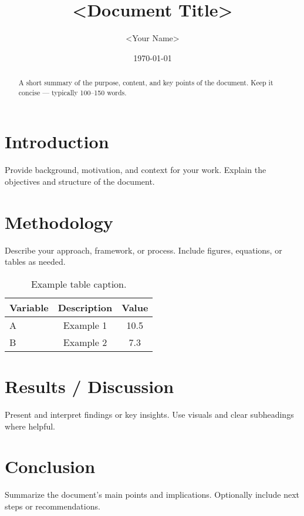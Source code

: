 \documentclass[12pt,a4paper]{article}
\title{<Document Title>}
\author{<Your Name>}
\date{\today}
\begin{document}
\maketitle
\thispagestyle{empty}

\begin{abstract}
A short summary of the purpose, content, and key points of the document.
Keep it concise — typically 100–150 words.
\end{abstract}

\newpage
\tableofcontents
\newpage


\section{Introduction}
Provide background, motivation, and context for your work. 
Explain the objectives and structure of the document.

\section{Methodology}
Describe your approach, framework, or process. 
Include figures, equations, or tables as needed.


\begin{table}[H]
    \centering
    \begin{tabular}{lcc}
        \toprule
        Variable & Description & Value \\
        \midrule
        A & Example 1 & 10.5 \\
        B & Example 2 & 7.3 \\
        \bottomrule
    \end{tabular}
    \caption{Example table caption.}
\end{table}

\section{Results / Discussion}
Present and interpret findings or key insights. 
Use visuals and clear subheadings where helpful.

\section{Conclusion}
Summarize the document’s main points and implications. 
Optionally include next steps or recommendations.


\newpage


\end{document}
